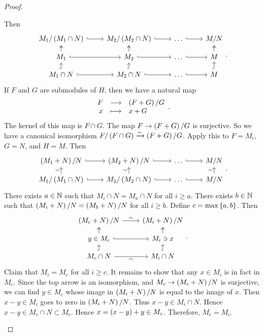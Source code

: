 \begin{proof}
\begin{itemize}
Then
$$
\begin{tikzcd}[row sep=small]
M_1 / \br{M_1 \cap N} \arrow[hookrightarrow]{r} & M_2 / \br{M_2 \cap N} \arrow[hookrightarrow]{r} & \dots \arrow[hookrightarrow]{r} & M / N \\
M_1 \arrow[twoheadrightarrow]{u} \arrow[hookrightarrow]{r} & M_2 \arrow[twoheadrightarrow]{u} \arrow[hookrightarrow]{r} & \dots \arrow[hookrightarrow]{r} & M \arrow[twoheadrightarrow]{u} \\
M_1 \cap N \arrow[hookrightarrow]{u} \arrow[hookrightarrow]{r} & M_2 \cap N \arrow[hookrightarrow]{u} \arrow[hookrightarrow]{r} & \dots \arrow[hookrightarrow]{r} & M \arrow[hookrightarrow]{u}
\end{tikzcd}.
$$
If $ F $ and $ G $ are submodules of $ H $, then we have a natural map
$$ \function{F}{\br{F + G} / G}{x}{x + G}. $$
The kernel of this map is $ F \cap G $. The map $ F \to \br{F + G} / G $ is surjective. So we have a canonical isomorphism $ F / \br{F \cap G} \xrightarrow{\sim} \br{F + G} / G $. Apply this to $ F = M_i $, $ G = N $, and $ H = M $. Then
$$
\begin{tikzcd}[row sep=small]
\br{M_1 + N} / N \arrow[hookrightarrow]{r} & \br{M_2 + N} / N \arrow[hookrightarrow]{r} & \dots \arrow[hookrightarrow]{r} & M / N \\
M_1 / \br{M_1 \cap N} \arrow{u}{\sim} \arrow[hookrightarrow]{r} & M_2 / \br{M_2 \cap N} \arrow{u}{\sim} \arrow[hookrightarrow]{r} & \dots \arrow[hookrightarrow]{r} & M / N \arrow{u}{\sim}
\end{tikzcd}.
$$
There exists $ a \in \mathbb{N} $ such that $ M_i \cap N = M_a \cap N $ for all $ i \ge a $. There exists $ b \in \mathbb{N} $ such that $ \br{M_i + N} / N = \br{M_b + N} / N $ for all $ i \ge b $. Define $ c = \max\cbr{a, b} $. Then
$$
\begin{tikzcd}[row sep=small]
\br{M_c + N} / N \arrow{r}{\sim} & \br{M_i + N} / N \\
y \in M_c \arrow[twoheadrightarrow]{u} \arrow[hookrightarrow]{r} & M_i \ni x \arrow[twoheadrightarrow]{u} \\
M_c \cap N \arrow[hookrightarrow]{u} \arrow{r}[swap]{\sim} & M_i \cap N \arrow[hookrightarrow]{u}
\end{tikzcd}.
$$
Claim that $ M_i = M_c $ for all $ i \ge c $. It remains to show that any $ x \in M_i $ is in fact in $ M_c $. Since the top arrow is an isomorphism, and $ M_c \to \br{M_c + N} / N $ is surjective, we can find $ y \in M_c $ whose image in $ \br{M_i + N} / N $ is equal to the image of $ x $. Then $ x - y \in M_i $ goes to zero in $ \br{M_i + N} / N $. Thus $ x - y \in M_i \cap N $. Hence $ x - y \in M_c \cap N \subset M_c $. Hence $ x = \br{x - y} + y \in M_c $. Therefore, $ M_c = M_i $.
\end{itemize}
\end{proof}

